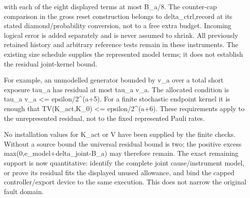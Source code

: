 \documentclass[
]{article}
\begin{document}
\begin{quote}
\end{quote}

with each of the eight displayed terms at most B\_a/8. The counter-cap
comparison in the gross reset construction belongs to
d\allowbreak{}e\allowbreak{}l\allowbreak{}t\allowbreak{}a\allowbreak{}\_\allowbreak{}c\allowbreak{}t\allowbreak{}r\allowbreak{}l\allowbreak{},\allowbreak{}r\allowbreak{}e\allowbreak{}c\allowbreak{}o\allowbreak{}r\allowbreak{}d
at its stated
d\allowbreak{}i\allowbreak{}a\allowbreak{}m\allowbreak{}o\allowbreak{}n\allowbreak{}d\allowbreak{}/\allowbreak{}p\allowbreak{}r\allowbreak{}o\allowbreak{}b\allowbreak{}a\allowbreak{}b\allowbreak{}i\allowbreak{}l\allowbreak{}i\allowbreak{}t\allowbreak{}y
conversion, not to a free extra budget. Incoming logical error is added
separately and is never assumed to shrink. All previously retained
history and arbitrary reference tests remain in these instruments. The
existing size schedule supplies the represented model terms; it does not
establish the residual joint-kernel bound.

For example, an unmodelled generator bounded by v\_a over a total short
exposure tau\_a has residual at most tau\_a v\_a. The allocated
condition is tau\_a v\_a \textless=
e\allowbreak{}p\allowbreak{}s\allowbreak{}i\allowbreak{}l\allowbreak{}o\allowbreak{}n\allowbreak{}/\allowbreak{}2\allowbreak{}\^{}\allowbreak{}(\allowbreak{}a\allowbreak{}+\allowbreak{}5\allowbreak{})\allowbreak{}.
For a finite stochastic endpoint kernel it is enough that
TV(K\_act,K\_0) \textless=
e\allowbreak{}p\allowbreak{}s\allowbreak{}i\allowbreak{}l\allowbreak{}o\allowbreak{}n\allowbreak{}/\allowbreak{}2\allowbreak{}\^{}\allowbreak{}(\allowbreak{}a\allowbreak{}+\allowbreak{}6\allowbreak{})\allowbreak{}.
These requirements apply to the unrepresented residual, not to the fixed
represented Pauli rates.

No installation values for K\_act or V have been supplied by the finite
checks. Without a source bound the universal residual bound is two; the
positive excess
m\allowbreak{}a\allowbreak{}x\allowbreak{}(\allowbreak{}0\allowbreak{},\allowbreak{}e\allowbreak{}\_\allowbreak{}m\allowbreak{}o\allowbreak{}d\allowbreak{}e\allowbreak{}l\allowbreak{}+\allowbreak{}d\allowbreak{}e\allowbreak{}l\allowbreak{}t\allowbreak{}a\allowbreak{}\_\allowbreak{}j\allowbreak{}o\allowbreak{}i\allowbreak{}n\allowbreak{}t\allowbreak{}-\allowbreak{}B\allowbreak{}\_\allowbreak{}a\allowbreak{})
may therefore remain. The exact remaining support is now quantitative:
identify the complete joint
c\allowbreak{}a\allowbreak{}u\allowbreak{}s\allowbreak{}e\allowbreak{}/\allowbreak{}i\allowbreak{}n\allowbreak{}s\allowbreak{}t\allowbreak{}r\allowbreak{}u\allowbreak{}m\allowbreak{}e\allowbreak{}n\allowbreak{}t
model, or prove its residual fits the displayed unused allowance, and
bind the capped
c\allowbreak{}o\allowbreak{}n\allowbreak{}t\allowbreak{}r\allowbreak{}o\allowbreak{}l\allowbreak{}l\allowbreak{}e\allowbreak{}r\allowbreak{}/\allowbreak{}e\allowbreak{}x\allowbreak{}p\allowbreak{}o\allowbreak{}r\allowbreak{}t
device to the same execution. This does not narrow the original fault
domain.
\end{document}
